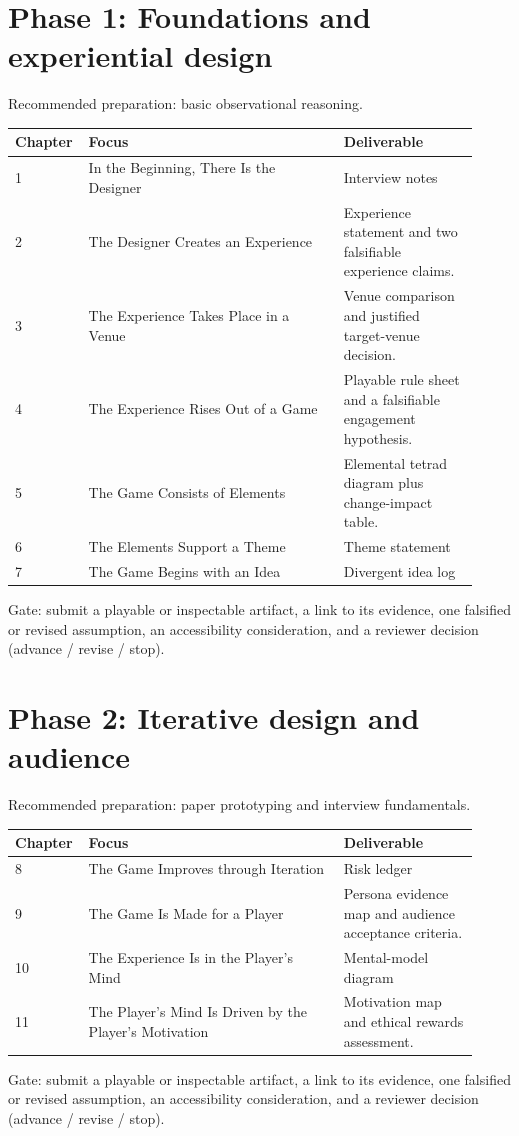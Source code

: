 \documentclass[11pt]{article}
\begin{document}
\section{Phase 1: Foundations and experiential design}
Recommended preparation: basic observational reasoning.

\begin{longtable}{@{}p{0.11\linewidth}p{0.53\linewidth}p{0.28\linewidth}@{}}\toprule Chapter & Focus & Deliverable \\ \midrule\endhead
1 & In the Beginning, There Is the Designer & Interview notes \\
2 & The Designer Creates an Experience & Experience statement and two falsifiable experience claims. \\
3 & The Experience Takes Place in a Venue & Venue comparison and justified target-venue decision. \\
4 & The Experience Rises Out of a Game & Playable rule sheet and a falsifiable engagement hypothesis. \\
5 & The Game Consists of Elements & Elemental tetrad diagram plus change-impact table. \\
6 & The Elements Support a Theme & Theme statement \\
7 & The Game Begins with an Idea & Divergent idea log \\
\bottomrule\end{longtable}
Gate: submit a playable or inspectable artifact, a link to its evidence, one falsified or revised assumption, an accessibility consideration, and a reviewer decision (advance / revise / stop).


\section{Phase 2: Iterative design and audience}
Recommended preparation: paper prototyping and interview fundamentals.

\begin{longtable}{@{}p{0.11\linewidth}p{0.53\linewidth}p{0.28\linewidth}@{}}\toprule Chapter & Focus & Deliverable \\ \midrule\endhead
8 & The Game Improves through Iteration & Risk ledger \\
9 & The Game Is Made for a Player & Persona evidence map and audience acceptance criteria. \\
10 & The Experience Is in the Player's Mind & Mental-model diagram \\
11 & The Player's Mind Is Driven by the Player's Motivation & Motivation map and ethical rewards assessment. \\
\bottomrule\end{longtable}
Gate: submit a playable or inspectable artifact, a link to its evidence, one falsified or revised assumption, an accessibility consideration, and a reviewer decision (advance / revise / stop).
\end{document}
